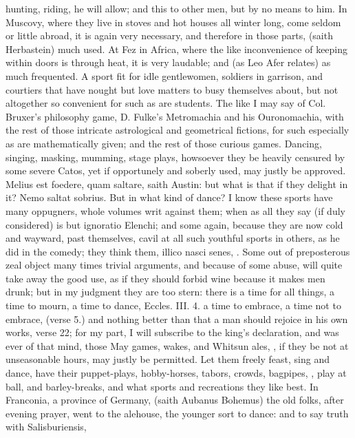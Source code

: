 {hunting, riding, \etc{} he will allow; and this to other men, but by no
means to him. In Muscovy, where they live in stoves and hot houses all
winter long, come seldom or little abroad, it is again very necessary,
and therefore in those parts, (saith Herbastein) much used. At
Fez in Africa, where the like inconvenience of keeping within doors is
through heat, it is very laudable; and (as Leo Afer relates) as
much frequented. A sport fit for idle gentlewomen, soldiers in
garrison, and courtiers that have nought but love matters to busy
themselves about, but not altogether so convenient for such as are
students. The like I may say of Col. Bruxer's philosophy game, D.
Fulke's Metromachia and his Ouronomachia, with the rest of those
intricate astrological and geometrical fictions, for such especially as
are mathematically given; and the rest of those curious games.
Dancing, singing, masking, mumming, stage plays, howsoever they be
heavily censured by some severe Catos, yet if opportunely and soberly
used, may justly be approved. Melius est foedere, quam saltare,
saith Austin: but what is that if they delight in it? Nemo
saltat sobrius. But in what kind of dance? I know these sports have
many oppugners, whole volumes writ against them; when as all they say
(if duly considered) is but ignoratio Elenchi; and some again, because
they are now cold and wayward, past themselves, cavil at all such
youthful sports in others, as he did in the comedy; they think them,
illico nasci senes, \etc{}. Some out of preposterous zeal object many times
trivial arguments, and because of some abuse, will quite take away the
good use, as if they should forbid wine because it makes men drunk; but
in my judgment they are too stern: there is a time for all things, a
time to mourn, a time to dance, Eccles. III. 4. a time to embrace, a
time not to embrace, (verse 5.) and nothing better than that a man
should rejoice in his own works, verse 22; for my part, I will
subscribe to the king's declaration, and was ever of that mind, those
May games, wakes, and Whitsun ales, \etc{}, if they be not at unseasonable
hours, may justly be permitted. Let them freely feast, sing and dance,
have their puppet-plays, hobby-horses, tabors, crowds, bagpipes, \etc{},
play at ball, and barley-breaks, and what sports and recreations they
like best. In Franconia, a province of Germany, (saith Aubanus
Bohemus) the old folks, after evening prayer, went to the alehouse, the
younger sort to dance: and to say truth with Salisburiensis,
}
